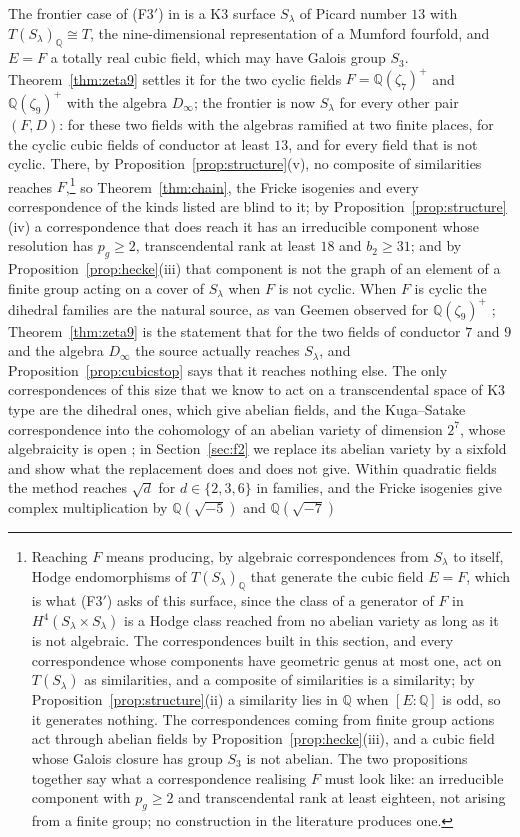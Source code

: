 \documentclass[11pt,reqno]{amsart}
\numberwithin{equation}{section}
\theoremstyle{plain}
\theoremstyle{definition}
\newcommand{\QQ}{\mathbb{Q}}
\newcommand{\Fiii}{\texorpdfstring{\textup{(F3$'$)}}{(F3')}}
\begin{document}
The frontier case of \Fiii{} in \cite[Thm.~21.4 and Rem.~21.5]{BMB26} is a K3 surface $S_{\lambda}$ of Picard number $13$ with $T(S_{\lambda})_{\QQ}\cong T$, the nine-dimensional representation of a Mumford fourfold, and $E=F$ a totally real cubic field, which may have Galois group $S_{3}$. Theorem~\ref{thm:zeta9} settles it for the two cyclic fields $F=\QQ(\zeta_{7})^{+}$ and $\QQ(\zeta_{9})^{+}$ with the algebra $D_{\infty}$; the frontier is now $S_{\lambda}$ for every other pair $(F,D)$: for these two fields with the algebras ramified at two finite places, for the cyclic cubic fields of conductor at least $13$, and for every field that is not cyclic. There, by Proposition~\ref{prop:structure}(v), no composite of similarities reaches $F$,\footnote{Reaching $F$ means producing, by algebraic correspondences from $S_{\lambda}$ to itself, Hodge endomorphisms of $T(S_{\lambda})_{\QQ}$ that generate the cubic field $E=F$, which is what \Fiii{} asks of this surface, since the class of a generator of $F$ in $H^{4}(S_{\lambda}\times S_{\lambda})$ is a Hodge class reached from no abelian variety as long as it is not algebraic. The correspondences built in this section, and every correspondence whose components have geometric genus at most one, act on $T(S_{\lambda})$ as similarities, and a composite of similarities is a similarity; by Proposition~\ref{prop:structure}(ii) a similarity lies in $\QQ$ when $[E:\QQ]$ is odd, so it generates nothing. The correspondences coming from finite group actions act through abelian fields by Proposition~\ref{prop:hecke}(iii), and a cubic field whose Galois closure has group $S_{3}$ is not abelian. The two propositions together say what a correspondence realising $F$ must look like: an irreducible component with $p_{g}\ge2$ and transcendental rank at least eighteen, not arising from a finite group; no construction in the literature produces one.} so Theorem~\ref{thm:chain}, the Fricke isogenies and every correspondence of the kinds listed are blind to it; by Proposition~\ref{prop:structure}(iv) a correspondence that does reach it has an irreducible component whose resolution has $p_{g}\ge2$, transcendental rank at least $18$ and $b_{2}\ge31$; and by Proposition~\ref{prop:hecke}(iii) that component is not the graph of an element of a finite group acting on a cover of $S_{\lambda}$ when $F$ is not cyclic. When $F$ is cyclic the dihedral families are the natural source, as van Geemen observed for $\QQ(\zeta_{9})^{+}$ \cite[Rem.~7.9]{vG08}; Theorem~\ref{thm:zeta9} is the statement that for the two fields of conductor $7$ and $9$ and the algebra $D_{\infty}$ the source actually reaches $S_{\lambda}$, and Proposition~\ref{prop:cubicstop} says that it reaches nothing else. The only correspondences of this size that we know to act on a transcendental space of K3 type are the dihedral ones, which give abelian fields, and the Kuga--Satake correspondence into the cohomology of an abelian variety of dimension $2^{7}$, whose algebraicity is open \cite{Del72,vG00}; in Section~\ref{sec:f2} we replace its abelian variety by a sixfold and show what the replacement does and does not give. Within quadratic fields the method reaches $\sqrt d$ for $d\in\{2,3,6\}$ in families, and the Fricke isogenies give complex multiplication by $\QQ(\sqrt{-5})$ and $\QQ(\sqrt{-7})$ 
\end{document}

